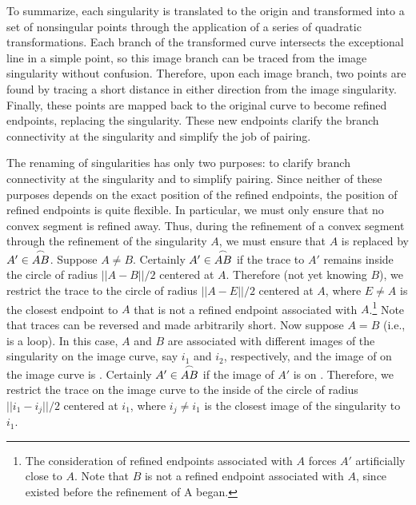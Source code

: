 
To summarize, each singularity is translated to the origin and transformed 
into a set of nonsingular points through the application of a series of quadratic 
transformations.  Each branch of the transformed curve intersects the 
exceptional line in a simple point, so this image branch can be traced
from the image singularity without confusion.
Therefore, upon each image branch, two points are found by tracing a 
short distance in either direction from the image singularity.
Finally, these points are mapped back to the original curve
to become refined endpoints, replacing the singularity.
These new endpoints clarify the branch connectivity at the singularity
and simplify the job of pairing.


The renaming of singularities has only two purposes: to clarify branch
connectivity at the singularity and to simplify pairing.
Since neither of these purposes depends on the exact position of the refined endpoints,
the position of refined endpoints is quite flexible.
\label{page-flex}
In particular, we must only ensure that no convex segment is refined away.
Thus, during the refinement of a convex segment  through the refinement
of the singularity $A$, we must ensure that $A$ is replaced by 
$A' \in \mbox{$\stackrel{\frown}{AB}$}$.
Suppose $A \neq B$.
Certainly $A' \in \mbox{$\stackrel{\frown}{AB}$}$ if the trace to $A'$ remains inside
the circle of radius $||A - B||/2$ centered at $A$.
Therefore (not yet knowing $B$), we restrict the trace to the circle
of radius $||A - E||/2$ centered at $A$, where $E \neq A$ is the closest endpoint
to $A$ that is not a refined endpoint associated with $A$.\footnote{The consideration of 
	refined endpoints
	associated with $A$ forces $A'$ artificially close to $A$.
	Note that $B$ is not 
	a refined endpoint associated with $A$, since  
	existed before the refinement of A began.}
Note that traces can be reversed and made arbitrarily short.
Now suppose $A = B$ (i.e.,  is a loop).
In this case, $A$ and $B$ are associated with different images 
of the singularity on the image curve, say $i_{1}$ and $i_{2}$, respectively, and 
the image of  on the image curve is .
Certainly $A' \in \mbox{$\stackrel{\frown}{AB}$}$ if the image of $A'$ is on .
Therefore, we restrict the trace on the image curve to the
inside of the circle of radius
$||i_{1} - i_{j}||/2$ centered at $i_{1}$, 
where $i_{j} \neq i_{1}$ is the closest image of the singularity to $i_{1}$.

